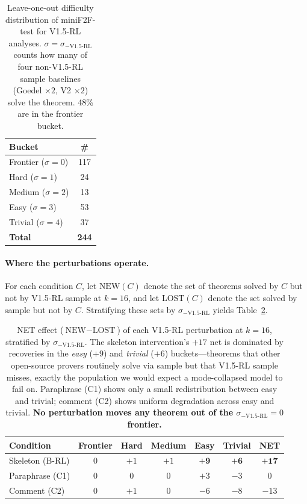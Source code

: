 \documentclass{article}
\begin{document}
\begin{table}[t]
\centering
\small
\begin{tabular}{lc}
\toprule
\textbf{Bucket} & \textbf{\#} \\
\midrule
Frontier ($\sigma{=}0$)  & 117 \\
Hard     ($\sigma{=}1$)  & 24  \\
Medium   ($\sigma{=}2$)  & 13  \\
Easy     ($\sigma{=}3$)  & 53  \\
Trivial  ($\sigma{=}4$)  & 37  \\
\midrule
\textbf{Total}           & \textbf{244} \\
\bottomrule
\end{tabular}
\caption{Leave-one-out difficulty distribution of miniF2F-test for V1.5-RL analyses. $\sigma = \sigma_{-\text{V1.5-RL}}$ counts how many of four non-V1.5-RL sample baselines (Goedel $\times 2$, V2 $\times 2$) solve the theorem. 48\% are in the frontier bucket.}
\label{tab:difficulty_dist}
\end{table}

\paragraph{Where the perturbations operate.}
For each condition $C$, let $\text{NEW}(C)$ denote the set of theorems solved by $C$ but not by V1.5-RL sample at $k{=}16$, and let $\text{LOST}(C)$ denote the set solved by sample but not by $C$. Stratifying these sets by $\sigma_{-\text{V1.5-RL}}$ yields Table~\ref{tab:bucket_strat}.

\begin{table}[t]
\centering
\small
\begin{tabular}{lcccccc}
\toprule
\textbf{Condition} & \textbf{Frontier} & \textbf{Hard} & \textbf{Medium} & \textbf{Easy} & \textbf{Trivial} & \textbf{NET} \\
\midrule
Skeleton (B-RL) & 0 & $+1$ & $+1$  & $\mathbf{+9}$  & $\mathbf{+6}$  & $\mathbf{+17}$ \\
Paraphrase (C1) & 0 & 0    & 0     & $+3$           & $-3$           & 0              \\
Comment (C2)    & 0 & $+1$ & 0     & $-6$           & $-8$           & $-13$          \\
\bottomrule
\end{tabular}
\caption{NET effect ($\text{NEW}-\text{LOST}$) of each V1.5-RL perturbation at $k{=}16$, stratified by $\sigma_{-\text{V1.5-RL}}$. The skeleton intervention's $+17$ net is dominated by recoveries in the \emph{easy} ($+9$) and \emph{trivial} ($+6$) buckets---theorems that other open-source provers routinely solve via sample but that V1.5-RL sample misses, exactly the population we would expect a mode-collapsed model to fail on. Paraphrase (C1) shows only a small redistribution between easy and trivial; comment (C2) shows uniform degradation across easy and trivial. \textbf{No perturbation moves any theorem out of the $\sigma_{-\text{V1.5-RL}}{=}0$ frontier.}}
\label{tab:bucket_strat}
\end{table}
\end{document}
